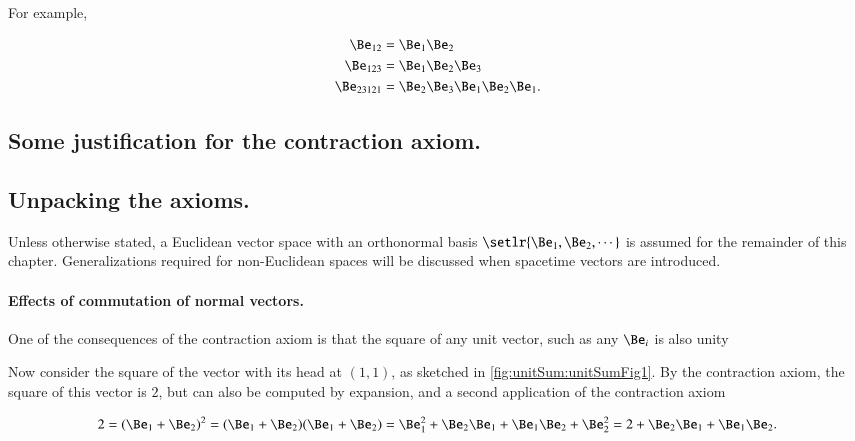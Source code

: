 For example, 

\begin{equation}\label{eqn:multivector:n}
\begin{aligned}
\Be_{12} &= \Be_1 \Be_2 \\
\Be_{123} &= \Be_1 \Be_2 \Be_3 \\
\Be_{23121} &= \Be_2 \Be_3 \Be_1 \Be_2 \Be_1.
\end{aligned}
\end{equation}

\subsection{Some justification for the contraction axiom.}



\subsection{Unpacking the axioms.}

Unless otherwise stated, a Euclidean vector space with an orthonormal basis \( \setlr{\Be_1, \Be_2, \cdots } \) is assumed for the remainder of this chapter.
Generalizations required for non-Euclidean spaces will be discussed when spacetime vectors are introduced.

\paragraph{Effects of commutation of normal vectors.}

One of the consequences of the contraction axiom is that
the square of any unit vector, such as any \( \Be_i \) is also unity


Now consider the square of the vector with its head at \( (1,1) \), as sketched in \cref{fig:unitSum:unitSumFig1}.
By the contraction axiom, the square of this vector is \( 2\), but can also be computed by expansion, and a second application of the contraction axiom

\begin{dmath}\label{eqn:gaTutorial:80}
2
=
(\Be_1 + \Be_2)^2
= (\Be_1 + \Be_2)(\Be_1 + \Be_2)
= \Be_1^2 + \Be_2 \Be_1 + \Be_1 \Be_2 + \Be_2^2
= 2 + \Be_2 \Be_1 + \Be_1 \Be_2.
\end{dmath}

